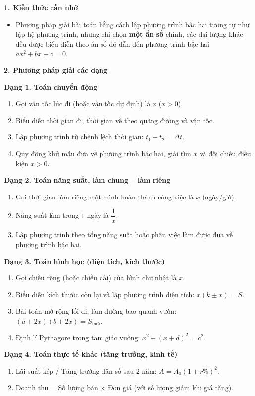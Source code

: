\textbf{1. Kiến thức cần nhớ}
\begin{itemize}
\item Phương pháp giải bài toán bằng cách lập phương trình bậc hai tương tự như lập hệ phương trình, nhưng chỉ chọn \textbf{một ẩn số} chính, các đại lượng khác đều được biểu diễn theo ẩn số đó dẫn đến phương trình bậc hai $ax^2 + bx + c = 0$.
\end{itemize}

\textbf{2. Phương pháp giải các dạng}

\textbf{Dạng 1. Toán chuyển động}
\begin{enumerate}
\item Gọi vận tốc lúc đi (hoặc vận tốc dự định) là $x$ ($x > 0$).
\item Biểu diễn thời gian đi, thời gian về theo quãng đường và vận tốc.
\item Lập phương trình từ chênh lệch thời gian: $t_1 - t_2 = \Delta t$.
\item Quy đồng khử mẫu đưa về phương trình bậc hai, giải tìm $x$ và đối chiếu điều kiện $x > 0$.
\end{enumerate}

\textbf{Dạng 2. Toán năng suất, làm chung – làm riêng}
\begin{enumerate}
\item Gọi thời gian làm riêng một mình hoàn thành công việc là $x$ (ngày/giờ).
\item Năng suất làm trong $1$ ngày là $\dfrac{1}{x}$.
\item Lập phương trình theo tổng năng suất hoặc phần việc làm được đưa về phương trình bậc hai.
\end{enumerate}

\textbf{Dạng 3. Toán hình học (diện tích, kích thước)}
\begin{enumerate}
\item Gọi chiều rộng (hoặc chiều dài) của hình chữ nhật là $x$.
\item Biểu diễn kích thước còn lại và lập phương trình diện tích: $x(k \pm x) = S$.
\item Bài toán mở rộng lối đi, làm đường bao quanh vườn: $(a + 2x)(b + 2x) = S_{\text{mới}}$.
\item Định lí Pythagore trong tam giác vuông: $x^2 + (x + d)^2 = c^2$.
\end{enumerate}

\textbf{Dạng 4. Toán thực tế khác (tăng trưởng, kinh tế)}
\begin{enumerate}
\item Lãi suất kép / Tăng trưởng dân số sau $2$ năm: $A = A_0(1 + r\%)^2$.
\item Doanh thu = Số lượng bán $\times$ Đơn giá (với số lượng giảm khi giá tăng).
\end{enumerate}
